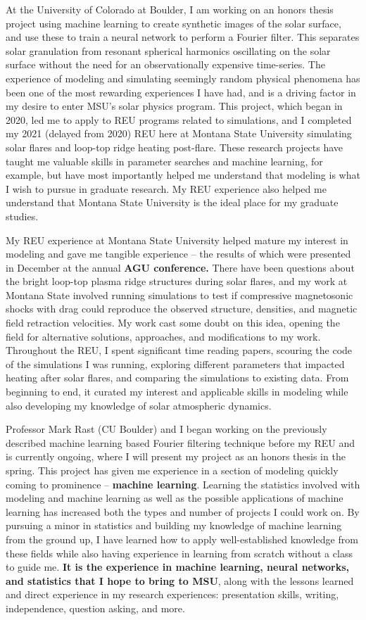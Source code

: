 \documentclass[11pt,letterpaper]{article}
\begin{document}
At the University of Colorado at Boulder, I am working on an honors thesis project using machine learning to create synthetic images of the solar surface, and use these to train a neural network to perform a Fourier filter. This separates solar granulation from resonant spherical harmonics oscillating on the solar surface without the need for an observationally expensive time-series. The experience of modeling and simulating seemingly random physical phenomena has been one of the most rewarding experiences I have had, and is a driving factor in my desire to enter MSU's solar physics program. This project, which began in 2020, led me to apply to REU programs related to simulations, and I completed my 2021 (delayed from 2020) REU here at Montana State University simulating solar flares and loop-top ridge heating post-flare. These research projects have taught me valuable skills in parameter searches and machine learning, for example, but have most importantly helped me understand that modeling is what I wish to pursue in graduate research. My REU experience also helped me understand that Montana State University is the ideal place for my graduate studies. 
 
My REU experience at Montana State University helped mature my interest in modeling and gave me tangible experience – the results of which were presented in December at the annual \textbf{AGU conference.} There have been questions about the bright loop-top plasma ridge structures during solar flares, and my work at Montana State involved running simulations to test if compressive magnetosonic shocks with drag could reproduce the observed structure, densities, and magnetic field retraction velocities. My work cast some doubt on this idea, opening the field for alternative solutions, approaches, and modifications to my work. Throughout the REU, I spent significant time reading papers, scouring the code of the simulations I was running, exploring different parameters that impacted heating after solar flares, and comparing the simulations to existing data. From beginning to end, it curated my interest and applicable skills in modeling while also developing my knowledge of solar atmospheric dynamics. 

Professor Mark Rast (CU Boulder) and I began working on the previously described machine learning based Fourier filtering technique before my REU and is currently ongoing, where I will present my project as an honors thesis in the spring. This project has given me experience in a section of modeling quickly coming to prominence -- \textbf{machine learning}. Learning the statistics involved with modeling and machine learning as well as the possible applications of machine learning has increased both the types and number of projects I could work on. By pursuing a minor in statistics and building my knowledge of machine learning from the ground up, I have learned how to apply well-established knowledge from these fields while also having experience in learning from scratch without a class to guide me. \textbf{It is the experience in machine learning, neural networks, and statistics that I hope to bring to MSU}, along with the lessons learned and direct experience in my research experiences: presentation skills, writing, independence, question asking, and more. 
\end{document}
